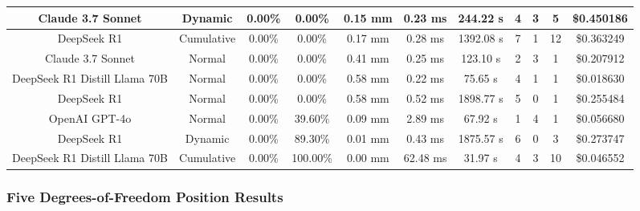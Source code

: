 \begin{table}[H]
\begin{center}
\begin{tabular}{|c|c|c|c|c|c|c|c|c|c|c|}
    \hline
    Claude 3.7 Sonnet & Dynamic & 0.00\% & 0.00\% & 0.15 mm & 0.23 ms & 244.22 s & 4 & 3 & 5 & \$0.450186 \\
    \hline
    DeepSeek R1 & Cumulative & 0.00\% & 0.00\% & 0.17 mm & 0.28 ms & 1392.08 s & 7 & 1 & 12 & \$0.363249 \\
    \hline
    Claude 3.7 Sonnet & Normal & 0.00\% & 0.00\% & 0.41 mm & 0.25 ms & 123.10 s & 2 & 3 & 1 & \$0.207912 \\
    \hline
    DeepSeek R1 Distill Llama 70B & Normal & 0.00\% & 0.00\% & 0.58 mm & 0.22 ms & 75.65 s & 4 & 1 & 1 & \$0.018630 \\
    \hline
    DeepSeek R1 & Normal & 0.00\% & 0.00\% & 0.58 mm & 0.52 ms & 1898.77 s & 5 & 0 & 1 & \$0.255484 \\
    \hline
    OpenAI GPT-4o & Normal & 0.00\% & 39.60\% & 0.09 mm & 2.89 ms & 67.92 s & 1 & 4 & 1 & \$0.056680 \\
    \hline
    DeepSeek R1 & Dynamic & 0.00\% & 89.30\% & 0.01 mm & 0.43 ms & 1875.57 s & 6 & 0 & 3 & \$0.273747 \\
    \hline
    DeepSeek R1 Distill Llama 70B & Cumulative & 0.00\% & 100.00\% & 0.00 mm & 62.48 ms & 31.97 s & 4 & 3 & 10 & \$0.046552 \\
    \hline
\end{tabular}
\label{Results-Position-3-6}
\end{center}
\end{table}

\subsubsection{Five Degrees-of-Freedom Position Results}

